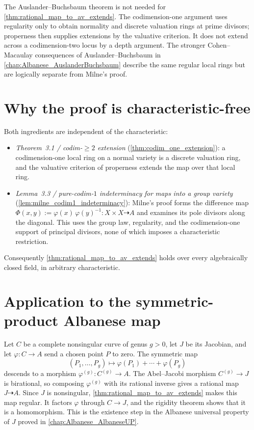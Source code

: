 \begin{remark}
  \label{rmk:thm32_role_of_ab}
  The Auslander--Buchsbaum theorem is not needed for
  \cref{thm:rational_map_to_av_extends}.  The codimension-one argument uses
  regularity only to obtain normality and discrete valuation rings at prime
  divisors; properness then supplies extensions by the valuative criterion.
  It does not extend across a codimension-two locus by a depth argument.
  The stronger Cohen--Macaulay consequences of Auslander--Buchsbaum in
  \cref{chap:Albanese_AuslanderBuchsbaum} describe the same regular local
  rings but are logically separate from Milne's proof.
\end{remark}

\section{Why the proof is characteristic-free}
\label{sec:thm32_char_free}

Both ingredients are independent of the characteristic:
\begin{itemize}
  \item \emph{Theorem~3.1 / codim-\(\geq 2\) extension} (\cref{thm:codim_one_extension}):
    a codimension-one local ring on a normal variety is a discrete valuation
    ring, and the valuative criterion of properness extends the map over that
    local ring.
  \item \emph{Lemma~3.3 / pure-codim-\(1\) indeterminacy for maps into a group variety}
    (\cref{lem:milne_codim1_indeterminacy}): Milne's proof forms the difference map
    \(\Phi(x, y) := \varphi(x)\,\varphi(y)^{-1} \colon X \times X \dashrightarrow A\) and
    examines its pole divisors along the diagonal.  This uses the group law,
    regularity, and the codimension-one support of principal divisors, none
    of which imposes a characteristic restriction.
\end{itemize}
Consequently \cref{thm:rational_map_to_av_extends} holds over every algebraically closed
field, in arbitrary characteristic.

\section{Application to the symmetric-product Albanese map}
\label{sec:thm32_application_to_a4d}

Let \(C\) be a complete nonsingular curve of genus \(g>0\), let \(J\) be
its Jacobian, and let \(\varphi\colon C\to A\) send a chosen point \(P\) to
zero.  The symmetric map
\[
  (P_1,\ldots,P_g)\longmapsto
  \varphi(P_1)+\cdots+\varphi(P_g)
\]
descends to a morphism \(\varphi^{(g)}\colon C^{(g)}\to A\).  The
Abel--Jacobi morphism \(C^{(g)}\to J\) is birational, so composing
\(\varphi^{(g)}\) with its rational inverse gives a rational map
\(J\dashrightarrow A\).  Since \(J\) is nonsingular,
\cref{thm:rational_map_to_av_extends} makes this map regular.  It factors
\(\varphi\) through \(C\to J\), and the rigidity theorem shows that it is a
homomorphism.  This is the existence step in the Albanese universal property
of \(J\) proved in \cref{chap:Albanese_AlbaneseUP}.


